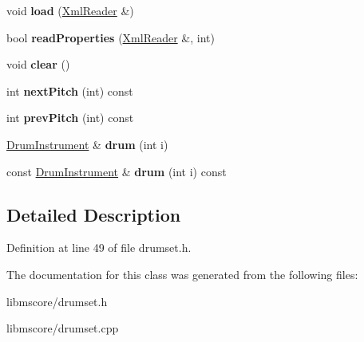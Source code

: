 \begin{DoxyCompactItemize}
void {\bfseries load} (\hyperlink{class_ms_1_1_xml_reader}{Xml\+Reader} \&)
\item 
\mbox{\label{class_ms_1_1_drumset_ac0b10d79b243f217e792e985b74ec369}} 
bool {\bfseries read\+Properties} (\hyperlink{class_ms_1_1_xml_reader}{Xml\+Reader} \&, int)
\item 
\mbox{\label{class_ms_1_1_drumset_a55a8c19f2c0e7903220050d1f781323e}} 
void {\bfseries clear} ()
\item 
\mbox{\label{class_ms_1_1_drumset_a135f92747ccc762fdb445b42bcfa2257}} 
int {\bfseries next\+Pitch} (int) const
\item 
\mbox{\label{class_ms_1_1_drumset_adb9ab2cf6f04d72290f32b1f4ba0a91b}} 
int {\bfseries prev\+Pitch} (int) const
\item 
\mbox{\label{class_ms_1_1_drumset_a88a25740ddb6687aba3878db67346ed6}} 
\hyperlink{struct_ms_1_1_drum_instrument}{Drum\+Instrument} \& {\bfseries drum} (int i)
\item 
\mbox{\label{class_ms_1_1_drumset_adbe7e00fabc139b7090956935ae62f4b}} 
const \hyperlink{struct_ms_1_1_drum_instrument}{Drum\+Instrument} \& {\bfseries drum} (int i) const
\end{DoxyCompactItemize}


\subsection{Detailed Description}


Definition at line 49 of file drumset.\+h.



The documentation for this class was generated from the following files\+:\begin{DoxyCompactItemize}
\item 
libmscore/drumset.\+h\item 
libmscore/drumset.\+cpp\end{DoxyCompactItemize}

